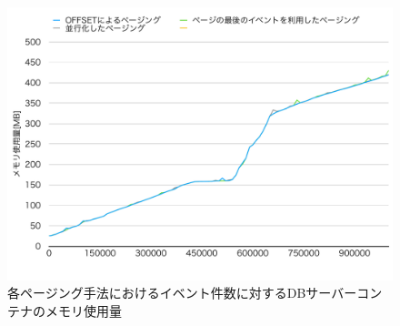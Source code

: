 \documentclass[../../../../../main]{subfiles}
\begin{document}
    \begin{figure}[H]
        \centering
        \includegraphics[width=12cm]{graph}
        \caption{各ページング手法におけるイベント件数に対するDBサーバーコンテナのメモリ使用量}
        \label{fig:each-paging-db-mem-app_1_1024-db_1_1024}
    \end{figure}
\end{document}
